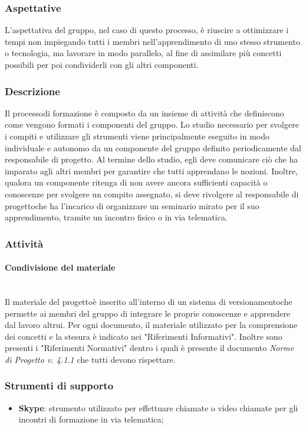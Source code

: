 		\subsubsection{Aspettative}
			L'aspettativa del gruppo, nel caso di questo processo\glo, è riuscire a ottimizzare i tempi non impiegando tutti i membri nell'apprendimento di uno stesso strumento o tecnologia, ma lavorare in modo parallelo, al fine di assimilare più concetti possibili per poi condividerli con gli altri componenti.
		\subsubsection{Descrizione}
			Il processo\glosp di formazione è composto da un insieme di attività che definiscono come vengono formati i componenti del gruppo.
			Lo studio necessario per svolgere i compiti e utilizzare gli strumenti viene principalmente eseguito in modo individuale e autonomo da un componente del gruppo definito periodicamente dal responsabile di progetto\glo. Al termine dello studio, egli deve comunicare ciò che ha imparato agli altri membri per garantire che tutti apprendano le nozioni.
			Inoltre, qualora un componente ritenga di non avere ancora sufficienti capacità o conoscenze per svolgere un compito assegnato, si deve rivolgere al responsabile di progetto\glosp che ha l'incarico di organizzare un seminario mirato per il suo apprendimento, tramite un incontro fisico o in via telematica.
		\subsubsection{Attività}
		\paragraph{Condivisione del materiale}\mbox{}\\ [1mm]
			Il materiale del progetto\glosp è inserito all'interno di un sistema di versionamento\glosp che permette ai membri del gruppo di integrare le proprie conoscenze e apprendere dal lavoro altrui.
			Per ogni documento, il materiale utilizzato per la comprensione dei concetti e la stesura è indicato nei "Riferimenti Informativi".
			Inoltre sono presenti i "Riferimenti Normativi" dentro i quali è presente il documento \textit{Norme di Progetto v. 4.1.1} che tutti devono rispettare.
		\subsubsection{Strumenti di supporto}
		\begin{itemize}
		 	\item \textbf{Skype}: strumento utilizzato per effettuare chiamate o video chiamate per gli incontri di formazione in via telematica;
	 	\end{itemize}
			
